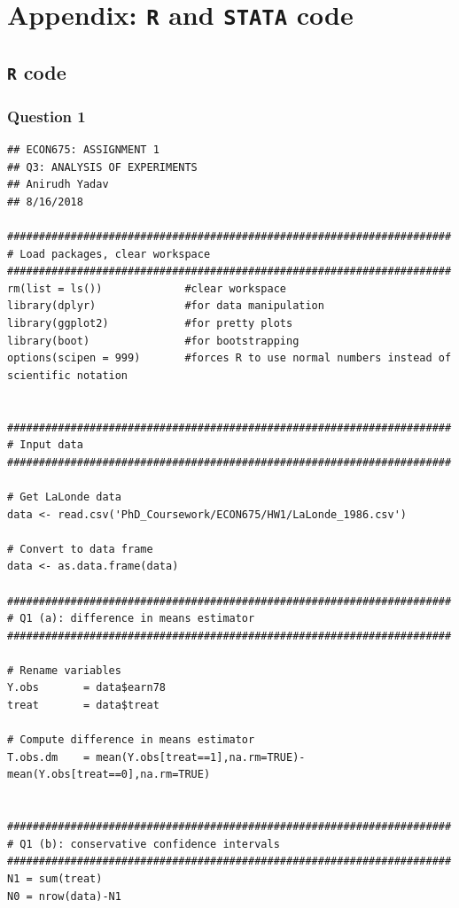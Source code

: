 \documentclass[12pt]{article}
\begin{document}
\newpage

\section{Appendix: \texttt{R} and \texttt{STATA} code}

\subsection{\texttt{R} code}
\subsubsection{Question 1}


\scriptsize


\begin{verbatim}
## ECON675: ASSIGNMENT 1
## Q3: ANALYSIS OF EXPERIMENTS
## Anirudh Yadav 
## 8/16/2018

######################################################################
# Load packages, clear workspace
######################################################################
rm(list = ls())             #clear workspace
library(dplyr)              #for data manipulation
library(ggplot2)            #for pretty plots
library(boot)               #for bootstrapping
options(scipen = 999)       #forces R to use normal numbers instead of scientific notation


######################################################################
# Input data
######################################################################

# Get LaLonde data
data <- read.csv('PhD_Coursework/ECON675/HW1/LaLonde_1986.csv')

# Convert to data frame
data <- as.data.frame(data)

######################################################################
# Q1 (a): difference in means estimator
######################################################################

# Rename variables
Y.obs       = data$earn78
treat       = data$treat

# Compute difference in means estimator
T.obs.dm    = mean(Y.obs[treat==1],na.rm=TRUE)-mean(Y.obs[treat==0],na.rm=TRUE)


######################################################################
# Q1 (b): conservative confidence intervals
######################################################################
N1 = sum(treat)
N0 = nrow(data)-N1


\end{verbatim}
\end{document}
